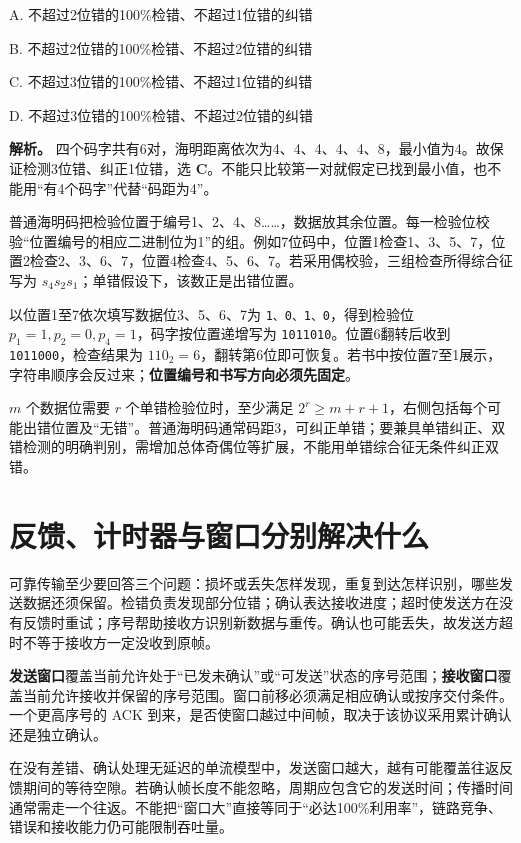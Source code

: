 A. 不超过2位错的100\%检错、不超过1位错的纠错

B. 不超过2位错的100\%检错、不超过2位错的纠错

C. 不超过3位错的100\%检错、不超过1位错的纠错

D. 不超过3位错的100\%检错、不超过2位错的纠错


\textbf{解析。} 四个码字共有6对，海明距离依次为4、4、4、4、4、8，最小值为4。故保证检测3位错、纠正1位错，选 \textbf{C}。不能只比较第一对就假定已找到最小值，也不能用``有4个码字''代替``码距为4''。

普通海明码把检验位置于编号1、2、4、8\ldots\ldots，数据放其余位置。每一检验位校验``位置编号的相应二进制位为1''的组。例如7位码中，位置1检查1、3、5、7，位置2检查2、3、6、7，位置4检查4、5、6、7。若采用偶校验，三组检查所得综合征写为 \(s_4s_2s_1\)；单错假设下，该数正是出错位置。

以位置1至7依次填写数据位3、5、6、7为 \allowbreak{}\texttt{1、0、1、0}，得到检验位 \(p_1=1,p_2=0,p_4=1\)，码字按位置递增写为 \allowbreak{}\texttt{1011010}。位置6翻转后收到 \allowbreak{}\texttt{1011000}，检查结果为 \(110_2=6\)，翻转第6位即可恢复。若书中按位置7至1展示，字符串顺序会反过来；\textbf{位置编号和书写方向必须先固定}。

\(m\) 个数据位需要 \(r\) 个单错检验位时，至少满足 \(2^r\ge m+r+1\)，右侧包括每个可能出错位置及``无错''。普通海明码通常码距3，可纠正单错；要兼具单错纠正、双错检测的明确判别，需增加总体奇偶位等扩展，不能用单错综合征无条件纠正双错。

\section{反馈、计时器与窗口分别解决什么}\label{cn-03-05}

可靠传输至少要回答三个问题：损坏或丢失怎样发现，重复到达怎样识别，哪些发送数据还须保留。检错负责发现部分位错；确认表达接收进度；超时使发送方在没有反馈时重试；序号帮助接收方识别新数据与重传。确认也可能丢失，故发送方超时不等于接收方一定没收到原帧。

\textbf{发送窗口}覆盖当前允许处于``已发未确认''或``可发送''状态的序号范围；\textbf{接收窗口}覆盖当前允许接收并保留的序号范围。窗口前移必须满足相应确认或按序交付条件。一个更高序号的 ACK 到来，是否使窗口越过中间帧，取决于该协议采用累计确认还是独立确认。

在没有差错、确认处理无延迟的单流模型中，发送窗口越大，越有可能覆盖往返反馈期间的等待空隙。若确认帧长度不能忽略，周期应包含它的发送时间；传播时间通常需走一个往返。不能把``窗口大''直接等同于``必达100\%利用率''，链路竞争、错误和接收能力仍可能限制吞吐量。

